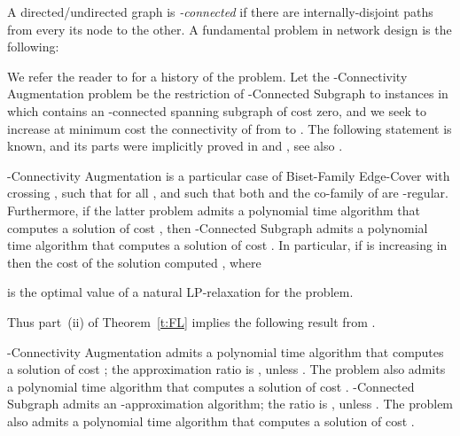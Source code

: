 A directed/undirected graph is {\em -connected} if there are
 internally-disjoint paths from every its node to the other.
A fundamental problem in network design is the following: 

\vspace{0.1cm}


\begin{center} 
\end{center}

\vspace{0.1cm}

We refer the reader to \cite{N,FL,KN-sur} for a history of the problem.
Let the {\sf -Connectivity Augmentation} problem be the restriction of 
{\sf -Connected Subgraph} to instances in which  contains an -connected spanning 
subgraph  of cost zero, and we seek to increase at minimum cost
the connectivity of  from  to . 
The following statement is known, and its parts were implicitly proved in \cite{FJ} and \cite{RW}, see also \cite{KN2}.

\begin{proposition} \label{p:RW}
{\sf -Connectivity Augmentation} is a particular case of {\sf Biset-Family Edge-Cover} with crossing 
, such that  for all , 
and such that both  and the co-family of  are -regular.
Furthermore, if the latter problem admits a polynomial time algorithm that computes a solution
of cost , then {\sf -Connected Subgraph}
admits a polynomial time algorithm that computes a solution 
of cost .
In particular, if  is increasing in  then the cost of the solution
computed , where 

is the optimal value of a natural LP-relaxation for the problem.
\end{proposition}

Thus part~(ii) of Theorem~\ref{t:FL} implies the following result from \cite{N}.

\begin{corollary} [\cite{N}] \label{c:aug}
{\sf -Connectivity Augmentation} admits a polynomial time algorithm 
that computes a solution of cost 
;
the approximation ratio is , unless .
The problem also admits a polynomial time algorithm that computes a solution of cost
.
{\sf -Connected Subgraph} admits an 
-approximation algorithm;
the ratio is , unless .
The problem also admits a polynomial time algorithm that computes a solution of cost
.
\end{corollary}

